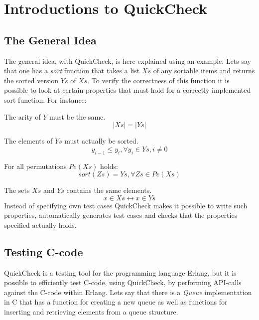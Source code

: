 \chapter{Introductions to QuickCheck}
\label{APP:QUICKCHECK}
\lstset{style=erlang}
\label{SEC:QuickCheckIntro}

\section{The General Idea}
The general idea, with QuickCheck, is here explained using an example.
Lets say that one has a \emph{sort} function that takes a list $Xs$ of any
sortable items and returns the sorted version $Ys$ of $Xs$. To verify the
correctness of this function it is possible to look at certain properties
that must hold for a correctly implemented sort function. For instance:

\noindent The arity of $Y$ must be the same.
\begin{equation}
        |Xs| = |Ys|
\end{equation}

\noindent The elements of $Ys$ must actually be sorted.
\begin{equation}
    y_{i-1} \leq y_i, \forall y_i \in Ys, i \neq 0
\end{equation}

\noindent For all permutations $Pe(Xs)$ holds:
\begin{equation}
sort(Zs) = Ys, \forall Zs \in Pe(Xs)
\end{equation}

\noindent The sets $Xs$ and $Ys$ contains the same elements.
\begin{equation}
        x \in Xs \leftrightarrow x \in Ys
\end{equation}
Instead of specifying own test cases QuickCheck makes it possible to write such
properties, automatically generates test cases and checks that the properties
specified actually holds.

\section{Testing C-code}
QuickCheck is a testing tool for the programming language Erlang, but it is
possible to efficiently test C-code, using QuickCheck, by performing API-calls
against the C-code within Erlang.  Lets say that there is a \emph{Queue}
implementation in C that has a function for creating a new queue as well
as functions for inserting and retrieving elements from a queue structure.


